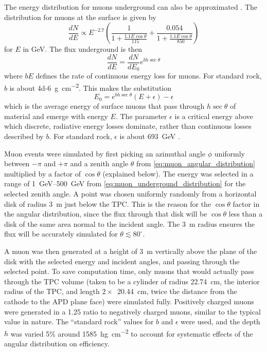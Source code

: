 \documentclass[herrin-thesis.tex]{subfiles}
\begin{document}
The energy distribution for muons underground can also be approximated \cite{Gaisser:1990kx}. The distribution for muons at the surface is given by
\begin{equation}
\label{eq:muon_surface_distribution}
\frac{dN}{dE} \propto E^{-2.7}\left(\frac{1}{1+\frac{1.1 E \cos \theta}{115}} + \frac{0.054}{1+\frac{1.1 E \cos \theta}{850}}\right)
\end{equation}
for \(E\) in \si{\GeV}. The flux underground is then
\begin{equation}
\label{eq:muon_underground_distribution}
\frac{dN}{dE} = \frac{dN}{dE_0}e^{b h \sec \theta}
\end{equation}
where \(b E\) defines the rate of continuous energy loss for muons. For standard rock, \(b\) is about \SI{4d-6}{\g\per\square\cm}. This makes the substitution
\begin{equation}
\label{eq:muon_E0_def}
E_0 = e^{b h \sec \theta}\left(E + \epsilon\right) - \epsilon
\end{equation}
which is the average energy of surface muons that pass through \(h\sec\theta\) of material and emerge with energy \(E\). The parameter \(\epsilon\) is a critical energy above which discrete, radiative energy losses dominate, rather than continuous losses described by \(b\). For standard rock, \(\epsilon\) is about \SI{693}{\GeV} \cite{groom:2001ys}.

Muon events were simulated by first picking an azimuthal angle \(\phi\) uniformly between \(-\pi\) and \(+\pi\) and a zenith angle \(\theta\) from \cref{eq:muon_angular_distribution} multiplied by a factor of \(\cos\theta\) (explained below). The energy was selected in a range of \SIrange{1}{500}{\GeV} from \cref{eq:muon_underground_distribution} for the selected zenith angle. A point was chosen uniformly randomly from a horizontal disk of radius \SI{3}{\m} just below the TPC. This is the reason for the \(\cos\theta\) factor in the angular distribution, since the flux through that disk will be \(\cos\theta\) less than a disk of the same area normal to the incident angle. The \SI{3}{\m} radius ensures the flux will be accurately simulated for \(\theta \lesssim 80^{\circ}\).

A muon was then generated at a height of \SI{3}{\meter} vertically above the plane of the disk with the selected energy and incident angles, and passing through the selected point. To save computation time, only muons that would actually pass through the TPC volume (taken to be a cylinder of radius  \SI{22.74}{\cm}, the interior radius of the TPC, and length \(2\times\)~\SI{20.44}{\cm}, twice the distance from the cathode to the APD plane face) were simulated fully. Positively charged muons were generated in a 1.25 ratio to negatively charged muons, similar to the typical value in nature. The ``standard rock'' values for \(b\) and \(\epsilon\) were used, and the depth \(h\) was varied 5\% around \SI{1585}{\hecto\g\per\square\cm} to account for systematic effects of the angular distribution on efficiency.
\end{document}
